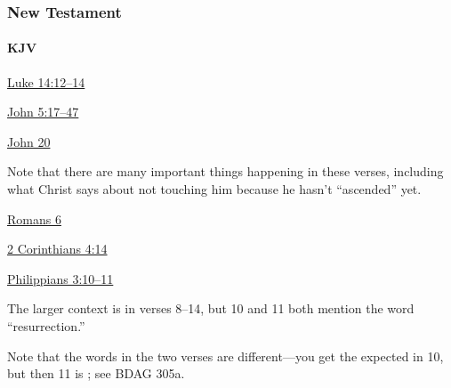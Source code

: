		
	\subsubsection{New Testament} %
		\label{RESURRECTION-NT}
	
		\paragraph{KJV}
			\label{RESURRECTION-NT-KJV}
			
	
			
			\begin{compactdesc}
				\item[{\hyperref[LUKE-14-12]{Luke 14:12--14}}]
				\item[{\hyperref[JOHN-5-17]{John 5:17--47}}]
				\item[{\hyperref[JOHN-20]{John 20}}] \phantom{.}
					\begin{compactitem}
						\item Note that there are many important things happening in these verses, including what Christ says about not touching him because he hasn't ``ascended'' yet.
					\end{compactitem}
				\item[{\hyperref[ROMANS-6]{Romans 6}}]
				\item[{\hyperref[2CORINTHIANS-4-14]{2 Corinthians 4:14}}]
				\item[{\hyperref[PHILIPPIANS-3-10]{Philippians 3:10--11}}] \phantom{.}
					\begin{compactitem}
						\item The larger context is in verses 8--14, but 10 and 11 both mention the word ``resurrection.'' 
						\item Note that the words in the two verses are different---you get the expected  in 10, but then 11 is ; see BDAG 305a.
					\end{compactitem}
			\end{compactdesc}
			
		
